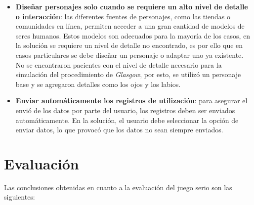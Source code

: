 \begin{itemize}
\item \textbf{Diseñar personajes solo cuando se requiere un alto nivel de
        detalle o interacción}: las diferentes fuentes de personajes, como las
    tiendas o comunidades en línea, permiten acceder a una gran cantidad de
    modelos de seres humanos. Estos modelos son adecuados para la mayoría de los
    casos, en la solución se requiere un nivel de detalle no encontrado, es por
    ello que en casos particulares se debe diseñar un personaje o adaptar uno ya
    existente. No se encontraron pacientes con el nivel de detalle necesario
    para la simulación del procedimiento de \emph{Glasgow}, por esto, se utilizó
    un personaje base y se agregaron detalles como los ojos y los labios.

\item \textbf{Enviar automáticamente los registros de utilización}: para asegurar el envió de los datos por parte del 
    usuario, los registros deben ser enviados automáticamente. En la solución, el 
    usuario debe seleccionar la opción de enviar datos, lo que provocó que los datos 
    no sean siempre enviados.

\end{itemize}

\section{Evaluación}

Las conclusiones obtenidas en cuanto a la evaluación del juego serio son las 
siguientes:

